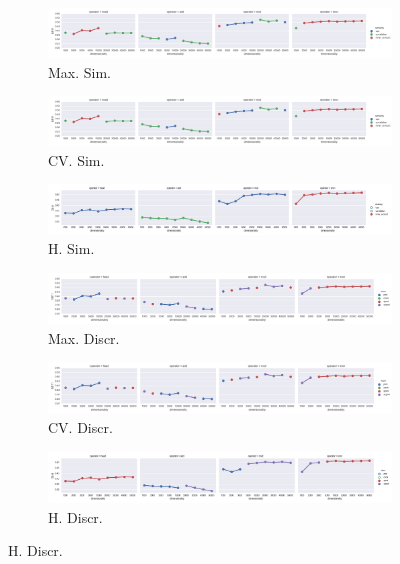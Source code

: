 \begin{landscape}
\begin{figure}
  \begin{subfigure}[t]{0.49\textwidth}
    \includegraphics[width=\textwidth]{supplement/figures/GS11-max_-selection-similarity}
    \caption{Max. Sim.}
    \label{fig:}
  \end{subfigure}
  \begin{subfigure}[t]{0.49\textwidth}
    \includegraphics[width=\textwidth]{supplement/figures/GS11-cross_validation-selection-similarity}
    \caption{CV. Sim.}
    \label{fig:}
  \end{subfigure}
  \begin{subfigure}[t]{0.49\textwidth}
    \includegraphics[width=\textwidth]{supplement/figures/GS11-heuristics-selection-similarity}
    \caption{H. Sim.}
    \label{fig:}
  \end{subfigure}

  \begin{subfigure}[t]{0.49\textwidth}
    \includegraphics[width=\textwidth]{supplement/figures/GS11-max_-selection-discr}
    \caption{Max. Discr.}
    \label{fig:}
  \end{subfigure}
  \begin{subfigure}[t]{0.49\textwidth}
    \includegraphics[width=\textwidth]{supplement/figures/GS11-cross_validation-selection-discr}
    \caption{CV. Discr.}
    \label{fig:}
  \end{subfigure}
  \begin{subfigure}[t]{0.49\textwidth}
    \includegraphics[width=\textwidth]{supplement/figures/GS11-heuristics-selection-discr}
    \caption{H. Discr.}
    \label{fig:}
  \end{subfigure}



\end{figure}
\end{landscape}
